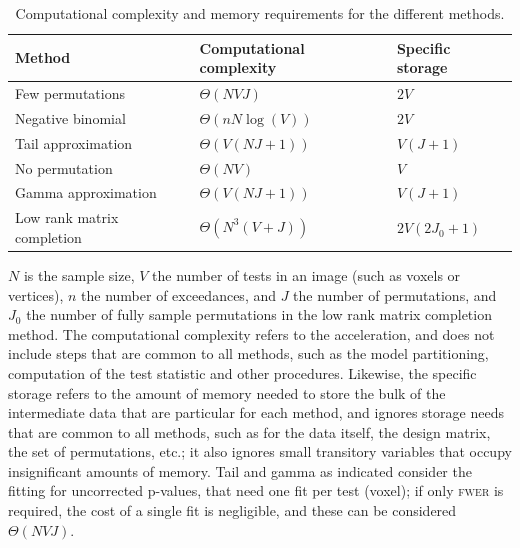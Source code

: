 \begin{table}[tp]
\caption{Computational complexity and memory requirements for the different methods.}
\vspace{-2mm}
\begin{center}
{\small
\begin{tabular}{@{}m{55mm}<{\raggedright}m{40mm}<{\raggedright}@{}m{19mm}<{\raggedright}@{}}
\toprule
Method & Computational complexity & Specific storage\\
\midrule
Few permutations           & $\Theta(NVJ)$       & $2V$\\
Negative binomial          & $\Theta(nN\log(V))$ & $2V$\\
Tail approximation         & $\Theta(V(NJ+1))$   & $V(J+1)$\\
No permutation             & $\Theta(NV)$        & $V$\\
Gamma approximation        & $\Theta(V(NJ+1))$   & $V(J+1)$\\
Low rank matrix completion & $\Theta(N^3(V+J))$  & $2V(2J_0+1)$\\
\bottomrule
\end{tabular}}
\end{center}
{\footnotesize
$N$ is the sample size, $V$ the number of tests in an image (such as voxels or vertices), $n$ the number of exceedances, and $J$ the number of permutations, and $J_0$ the number of fully sample permutations in the low rank matrix completion method. The computational complexity refers to the acceleration, and does not include steps that are common to all methods, such as the model partitioning, computation of the test statistic and other procedures. Likewise, the specific storage refers to the amount of memory needed to store the bulk of the intermediate data that are particular for each method, and ignores storage needs that are common to all methods, such as for the data itself, the design matrix, the set of permutations, etc.; it also ignores small transitory variables that occupy insignificant amounts of memory. Tail and gamma as indicated consider the fitting for uncorrected p-values, that need one fit per test (voxel); if only \textsc{fwer} is required, the cost of a single fit is negligible, and these can be considered $\Theta(NVJ)$.\par}
\label{tab:complexity}
\end{table}

